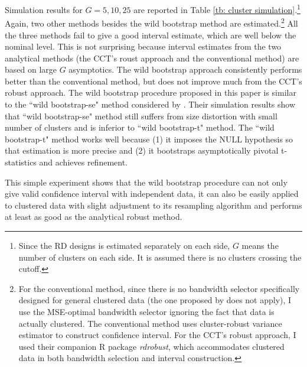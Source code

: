 \documentclass[12pt,]{article}
\DeclareMathOperator{\1}{\mathbbm{1}}
\begin{document}
Simulation results for $G = 5, 10, 25$ are reported in Table \ref{tb: cluster simulation}.\footnote{Since the RD designs is estimated separately on each side, $G$ means the number of clusters on each side. It is assumed there is no clusters crossing the cutoff.} Again, two other methods besides the wild bootstrap method are estimated.\footnote{For the conventional method, since there is no bandwidth selector specifically designed for general clustered data (the one proposed by \cite{bartalotti2016regression} does not apply), I use the MSE-optimal bandwidth selector ignoring the fact that data is actually clustered. The conventional method uses cluster-robust variance estimator to construct confidence interval. For the CCT's robust approach, I used their companion R package \textit{rdrobust}, which accommodates clustered data in both bandwidth selection and interval construction.} All the three methods fail to give a good interval estimate, which are well below the nominal level. This is not surprising because interval estimates from the two analytical methods (the CCT's roust approach and the conventional method) are based on large $G$ asymptotics. The wild bootstrap approach consistently performs better than the conventional method, but does not improve much from the CCT's robust approach. The wild bootstrap procedure proposed in this paper is similar to the ``wild bootstrap-se" method considered by \cite{cameron2008bootstrap}. Their simulation results show that ``wild bootstrap-se" method still suffers from size distortion with small number of clusters and is inferior to ``wild bootstrap-t" method. The ``wild bootstrap-t" method works well because (1) it imposes the NULL hypothesis so that estimation is more precise and (2) it bootstraps asymptotically pivotal t-statistics and achieves refinement. 

This simple experiment shows that the wild bootstrap procedure can not only give valid confidence interval with independent data, it can also be easily applied to clustered data with slight adjustment to its resampling algorithm and performs at least as good as the analytical robust method.
\end{document}

